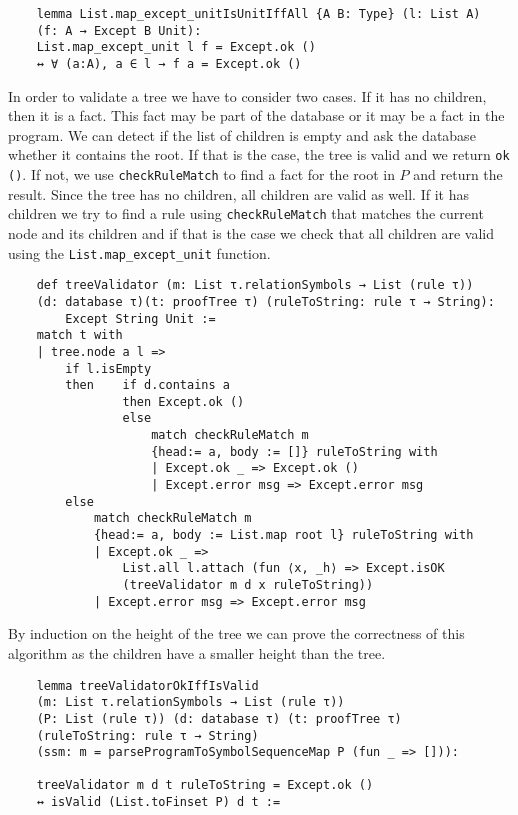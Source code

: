 \begin{lstlisting}
    lemma List.map_except_unitIsUnitIffAll {A B: Type} (l: List A) 
    (f: A → Except B Unit): 
    List.map_except_unit l f = Except.ok () 
    ↔ ∀ (a:A), a ∈ l → f a = Except.ok ()
\end{lstlisting}

In order to validate a tree we have to consider two cases. If it has no children, then it is a fact. This fact may be part of the database or it may be a fact in the program. We can detect if the list of children is empty and ask the database whether it contains the root. If that is the case, the tree is valid and we return \texttt{ok ()}. If not, we use \texttt{checkRuleMatch} to find a fact for the root in $P$ and return the result. Since the tree has no children, all children are valid as well.
If it has children we try to find a rule using \texttt{checkRuleMatch} that matches the current node and its children and if that is the case we check that all children are valid using the \texttt{List.map\_except\_unit} function.

\begin{lstlisting}
    def treeValidator (m: List τ.relationSymbols → List (rule τ)) 
    (d: database τ)(t: proofTree τ) (ruleToString: rule τ → String):
        Except String Unit :=
    match t with
    | tree.node a l =>
        if l.isEmpty
        then    if d.contains a
                then Except.ok ()
                else
                    match checkRuleMatch m 
                    {head:= a, body := []} ruleToString with
                    | Except.ok _ => Except.ok ()
                    | Except.error msg => Except.error msg
        else
            match checkRuleMatch m 
            {head:= a, body := List.map root l} ruleToString with
            | Except.ok _ => 
                List.all l.attach (fun ⟨x, _h⟩ => Except.isOK 
                (treeValidator m d x ruleToString))
            | Except.error msg => Except.error msg
\end{lstlisting}

By induction on the height of the tree we can prove the correctness of this algorithm as the children have a smaller height than the tree.

\begin{lstlisting}
    lemma treeValidatorOkIffIsValid 
    (m: List τ.relationSymbols → List (rule τ)) 
    (P: List (rule τ)) (d: database τ) (t: proofTree τ) 
    (ruleToString: rule τ → String) 
    (ssm: m = parseProgramToSymbolSequenceMap P (fun _ => [])): 
    
    treeValidator m d t ruleToString = Except.ok () 
    ↔ isValid (List.toFinset P) d t :=

\end{lstlisting}

